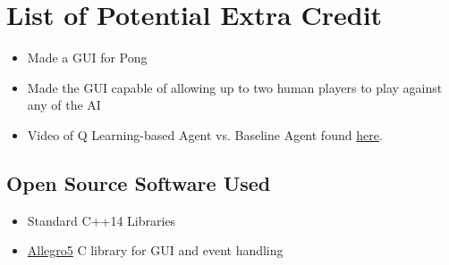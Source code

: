 \documentclass{article}[12pt]
\begin{document}
   
\newpage
   \section{List of Potential Extra Credit}
   \begin{itemize}
   \item Made a GUI for Pong
   \item Made the GUI capable of allowing up to two human players to play against any of the AI
   \item Video of Q Learning-based Agent vs. Baseline Agent found \href{https://www.youtube.com/watch?v=FWLAqNOhF6I}{here}.
\end{itemize}      
   
   \newpage
\begin{appendices}

   \section{Open Source Software Used}
   \begin{itemize}
   	\item Standard C++14 Libraries
   	\item \href{http://liballeg.org/}{Allegro5} C library for GUI and event handling
   \end{itemize}

\end{appendices}   
   
   
   
\end{document}
